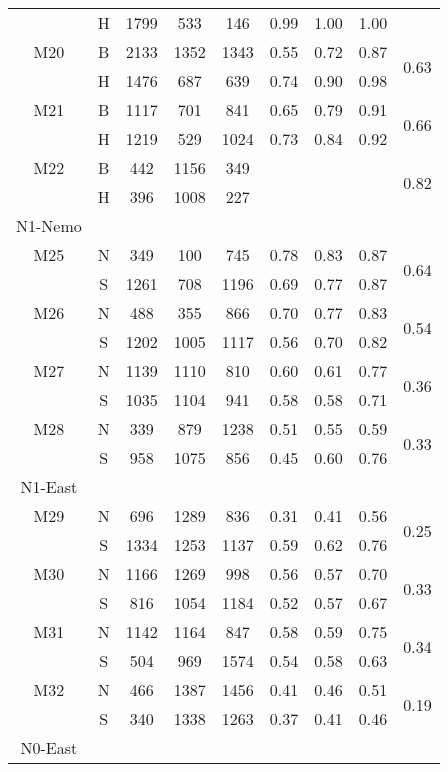 \begin{longtable}{c c c c c c c c c}
      & H & 1799 & 533 & 146 & 0.99 & 1.00 & 1.00 & \\
  M20 & B & 2133 & 1352 & 1343 & 0.55 & 0.72 & 0.87 & \multirow{2}{*}{0.63}\\
      & H & 1476 & 687 & 639 & 0.74 & 0.90 & 0.98 & \\
  M21 & B & 1117 & 701 & 841 & 0.65 & 0.79 & 0.91 & \multirow{2}{*}{0.66}\\
      & H & 1219 & 529 & 1024 & 0.73 & 0.84 & 0.92 & \\
  M22 & B & 442 & 1156 & 349 &   &   &   & \multirow{2}{*}{0.82}\\
      & H & 396 & 1008 & 227 &   &   &   & \\
  \midrule
  N1-Nemo\\
  \midrule
  M25 & N & 349 & 100 & 745 & 0.78 & 0.83 & 0.87 & \multirow{2}{*}{0.64} \\
      & S & 1261 & 708 & 1196 & 0.69 & 0.77 & 0.87 & \\
  M26 & N & 488 & 355 & 866 & 0.70 & 0.77 & 0.83 & \multirow{2}{*}{0.54} \\
      & S & 1202 & 1005 & 1117 & 0.56 & 0.70 & 0.82 & \\
  M27 & N & 1139 & 1110 & 810 & 0.60 & 0.61 & 0.77 & \multirow{2}{*}{0.36} \\
      & S & 1035 & 1104 & 941 & 0.58 & 0.58 & 0.71 & \\
  M28 & N & 339 & 879 & 1238 & 0.51 & 0.55 & 0.59 & \multirow{2}{*}{0.33} \\
      & S & 958 & 1075 & 856 & 0.45 & 0.60 & 0.76 & \\
  \midrule
  N1-East\\
  \midrule
  M29 & N & 696 & 1289 & 836 & 0.31 & 0.41 & 0.56 & \multirow{2}{*}{0.25} \\
      & S & 1334 & 1253 & 1137 & 0.59 & 0.62 & 0.76 & \\
  M30 & N & 1166 & 1269 & 998 & 0.56 & 0.57 & 0.70 & \multirow{2}{*}{0.33} \\
      & S & 816 & 1054 & 1184 & 0.52 & 0.57 & 0.67 & \\
  M31 & N & 1142 & 1164 & 847 & 0.58 & 0.59 & 0.75 & \multirow{2}{*}{0.34} \\
      & S & 504 & 969 & 1574 & 0.54 & 0.58 & 0.63 & \\
  M32 & N & 466 & 1387 & 1456 & 0.41 & 0.46 & 0.51 & \multirow{2}{*}{0.19} \\
      & S & 340 & 1338 & 1263 & 0.37 & 0.41 & 0.46 & \\
  \midrule
  N0-East\\

\end{longtable}
